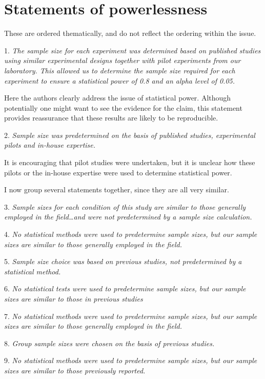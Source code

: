 \documentclass[a4paper,11pt]{article}
\begin{document}
\section*{Statements of powerlessness}

These are ordered thematically, and do not reflect the ordering within the issue.

1. {\em The sample size for each experiment was determined based on
  published studies using similar experimental designs together with
  pilot experiments from our laboratory. This allowed us to determine
  the sample size required for each experiment to ensure a statistical
  power of 0.8 and an alpha level of 0.05.}

Here the authors clearly address the issue of statistical
power. Although potentially one might want to see the evidence for the
claim, this statement provides reassurance that these
results are likely to be reproducible.

2. {\em Sample size was predetermined on the basis of published
  studies, experimental pilots and in-house expertise.}

It is encouraging that pilot studies were undertaken, but it is
unclear how these pilots or the in-house expertise were used to
determine statistical power.

I now group several statements together, since they are all very similar.

3. {\em Sample sizes for each condition of this study are similar to
  those generally employed in the field\ldots and were not
  predetermined by a sample size calculation.}

4. {\em No statistical methods were used to predetermine sample sizes,
  but our sample sizes are similar to those generally employed in the
  field.}

5. {\em Sample size choice was based on previous studies, not
  predetermined by a statistical method.}

6. {\em No statistical tests were used to predetermine sample sizes, but
  our sample sizes are similar to those in previous studies}

7. {\em No statistical methods were used to predetermine sample sizes,
  but our sample sizes are similar to those generally employed in the
  field.}

8. {\em Group sample sizes were chosen on the basis of previous studies.}

9. {\em No statistical methods were used to predetermine sample sizes,
  but our sample sizes are similar to those previously reported.}
\end{document}
